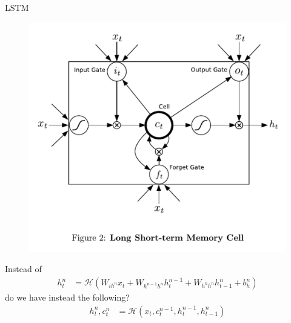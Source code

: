 \documentclass[xcolor=dvipsnames]{beamer}
\def\cH{\mathcal{H}}
\begin{document}
\begin{frame}{LSTM}
  \begin{figure}
    \centering
  \includegraphics[width=.75\linewidth]{fig/figure2.png} 
  \end{figure}
\end{frame}

\begin{frame}
  Instead of 
  \begin{align*}
  h_t^n &= \cH(W_{ih^n} x_t + W_{h^{n-1}h^{n}} h_{t}^{n-1} + W_{h^{n}h^{n}} h_{t-1}^n + b_h^n)
  \end{align*}
  do we have instead the following?
  \begin{align*}
  h_t^n, c_t^n &= \cH(x_t, c_t^{n-1}, h_{t}^{n-1}, h_{t-1}^n)
  \end{align*}
\end{frame}
\end{document}
